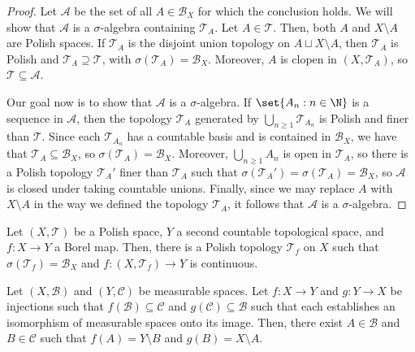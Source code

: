 \documentclass[10pt]{mypackage}
\begin{document}
\begin{proof}
  Let $\mathcal{A}$ be the set of all $A\in \mathcal{B}_X$ for which the conclusion holds. We will show that $\mathcal{A}$ is a $\sigma$-algebra containing $\mathcal{T}_A$. Let $A\in \mathcal{T}$. Then, both $A$ and $X\setminus A$ are Polish spaces. If $\mathcal{T}_A$ is the disjoint union topology on $A\sqcup X\setminus A$, then $\mathcal{T}_A$ is Polish and $\mathcal{T}_A\supseteq \mathcal{T}$, with $\sigma\left( \mathcal{T}_A \right) = \mathcal{B}_X$. Moreover, $A$ is clopen in $\left( X,\mathcal{T}_A \right)$, so $\mathcal{T}\subseteq \mathcal{A}$. 

  Our goal now is to show that $\mathcal{A}$ is a $\sigma$-algebra. If $\set{A_n : n\in \N}$ is a sequence in $\mathcal{A}$, then the topology $\mathcal{T}_A$ generated by $\bigcup_{n\geq 1}\mathcal{T}_{A_n}$ is Polish and finer than $\mathcal{T}$. Since each $\mathcal{T}_{A_n}$ has a countable basis and is contained in $\mathcal{B}_X$, we have that $\mathcal{T}_A\subseteq \mathcal{B}_X$, so $\sigma\left( \mathcal{T}_A \right) = \mathcal{B}_X$. Moreover, $\bigcup_{n\geq 1}A_n$ is open in $\mathcal{T}_A$, so there is a Polish topology $\mathcal{T}_{A}'$ finer than $\mathcal{T}_A$ such that $\sigma\left( \mathcal{T}_A' \right) = \sigma\left( \mathcal{T}_A \right) = \mathcal{B}_X$, so $\mathcal{A}$ is closed under taking countable unions. Finally, since we may replace $A$ with $X\setminus A$ in the way we defined the topology $\mathcal{T}_A$, it follows that $\mathcal{A}$ is a $\sigma$-algebra.
\end{proof}
\begin{corollary}
  Let $\left( X,\mathcal{T} \right)$ be a Polish space, $Y$ a second countable topological space, and $f\colon X\to Y$ a Borel map. Then, there is a Polish topology $\mathcal{T}_f$ on $X$ such that $\sigma\left( \mathcal{T}_f \right) = \mathcal{B}_X$ and $f\colon \left( X,\mathcal{T}_f \right)\to Y$ is continuous.
\end{corollary}
\begin{theorem}
  Let $\left( X,\mathcal{B} \right)$ and $\left( Y,\mathcal{C} \right)$ be measurable spaces. Let $f\colon X\to Y$ and $g\colon Y\to X$ be injections such that $f\left( \mathcal{B} \right)\subseteq \mathcal{C}$ and $g\left( \mathcal{C} \right)\subseteq \mathcal{B}$ such that each establishes an isomorphism of measurable spaces onto its image. Then, there exist $A\in \mathcal{B}$ and $B\in \mathcal{C}$ such that $f(A) = Y\setminus B$ and $g(B) = X\setminus A$.
\end{theorem}
\end{document}
